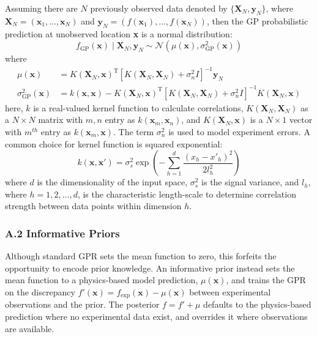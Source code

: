\documentclass[preprint,12pt,times]{elsarticle}  %
\begin{document}
Assuming there are $N$ previously observed data denoted by $\{\mathbf{X}_{N}, \mathbf{y}_{N}\}$, where $\mathbf{X}_{N} = (\mathbf{x}_{1}, \ldots, \mathbf{x}_{N})$ and $\mathbf{y}_{N} = \left(f(\mathbf{x}_{1}), \ldots, f(\mathbf{x}_{N})\right)$, then the GP probabilistic prediction at unobserved location \textbf{x} is a normal distribution:
\begin{equation}
\label{GP11}
f_{\textrm{GP}}(\mathbf{x}) \mid \mathbf{X}_{N}, \mathbf{y}_{N} \sim \mathcal{N}\left(\mu(\mathbf{x}),\sigma_{\textrm{GP}}^2(\mathbf{x})\right)
\end{equation}
where
\begin{equation}
\begin{aligned}
\label{meancov}
\mu(\mathbf{x}) &= K(\mathbf{X}_{N},\mathbf{x})^\textrm{T}[K(\mathbf{X}_{N},\mathbf{X}_{N})+\sigma^2_{n}I]^{-1} \mathbf{y}_{N}\\
\sigma_{\textrm{GP}}^2 (\mathbf{x})  &=  k(\mathbf{x},\mathbf{x}) - K(\mathbf{X}_{N},\mathbf{x})^\textrm{T} [K(\mathbf{X}_{N},\mathbf{X}_{N})+\sigma^2_{n}I]^{-1}K(\mathbf{X}_{N},\mathbf{x})
\end{aligned}
\end{equation}
here, $k$ is a real-valued kernel function to calculate correlations, $K(\mathbf{X}_{N},\mathbf{X}_{N})$ as a $N \times N$ matrix with $m,n$ entry as $k(\mathbf{x}_{m}, \mathbf{x}_{n})$, and $K(\mathbf{X}_{N}, \mathbf{x})$ is a $N \times 1$ vector with $m^{th}$ entry as $k(\mathbf{x}_{m}, \mathbf{x})$.  The term $\sigma^2_{n}$ is used to model experiment errors. A common choice for kernel function is squared exponential:
\begin{equation}
\label{eq:5}
k(\mathbf{x},\mathbf{x'}) = \sigma_s^2 \exp\left(- \sum_{h = 1}^{d} \frac {(x_h-x'_h)^2}{2l_h^2}\right )
\end{equation}
where $d$ is the dimensionality of the input space, $\sigma_s^2$ is the signal variance, and $l_h$, where $h = 1,2,\ldots,d$, is the characteristic length-scale to determine correlation strength between data points within dimension $h$.

\subsubsection*{A.2 Informative Priors}

Although standard GPR sets the mean function to zero, this forfeits the opportunity to encode prior knowledge. An informative prior instead sets the mean function to a physics-based model prediction, $\mu(\mathbf{x})$, and trains the GPR on the discrepancy $f'(\mathbf{x}) = f_{\textrm{exp}}(\mathbf{x}) - \mu(\mathbf{x})$ between experimental observations and the prior. The posterior $f = f' + \mu$ defaults to the physics-based prediction where no experimental data exist, and overrides it where observations are available.
\end{document}

